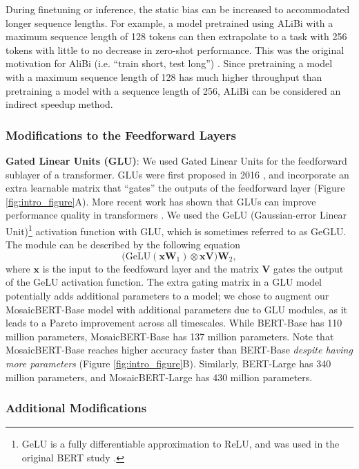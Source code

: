 \documentclass{article}
\begin{document}
During finetuning or inference, the static bias can be increased to accommodated longer sequence lengths. For example, a model pretrained using ALiBi with a maximum sequence length of 128 tokens can then extrapolate to a task with 256 tokens with little to no decrease in zero-shot performance. This was the original motivation for AliBi (i.e. ``train short, test long'') \citep{press2021train}. Since pretraining a model with a maximum sequence length of 128 has much higher throughput than pretraining a model with a sequence length of 256, ALiBi can be considered an indirect speedup method.


\subsubsection{Modifications to the Feedforward Layers}

\textbf{Gated Linear Units (GLU)}: We used Gated Linear Units for the feedforward sublayer of a transformer. GLUs were first proposed in 2016 \citep{dauphin2017language}, and incorporate an extra learnable matrix that “gates” the outputs of the feedforward layer (Figure \ref{fig:intro_figure}A). More recent work has shown that GLUs can improve performance quality in transformers \citep{shazeer2020glu,narang2021transformer}. We used the GeLU (Gaussian-error Linear Unit)\footnote{GeLU is a fully differentiable approximation to ReLU, and was used in the original BERT study \citep{devlin2018bert}.} activation function with GLU, which is sometimes referred to as GeGLU. The module can be described by the following equation
\begin{equation}
    \big(\textrm{GeLU}(\mathbf{x}\mathbf{W}_1) \otimes \textbf{x}\textbf{V} \big) \textbf{W}_2,
\end{equation}
where $\textbf{x}$ is the input to the feedfoward layer and the matrix $\textbf{V}$ gates the output of the GeLU activation function. 
The extra gating matrix in a GLU model potentially adds additional parameters to a model; we chose to augment our MosaicBERT-Base model with additional parameters due to GLU modules, as it leads to a Pareto improvement across all timescales. While BERT-Base has 110 million parameters, MosaicBERT-Base has 137 million parameters. Note that MosaicBERT-Base reaches higher accuracy faster than BERT-Base \textit{despite having more parameters} (Figure \ref{fig:intro_figure}B). Similarly, BERT-Large has 340 million parameters, and MosaicBERT-Large has 430 million parameters.

\subsubsection{Additional Modifications}
\end{document}
